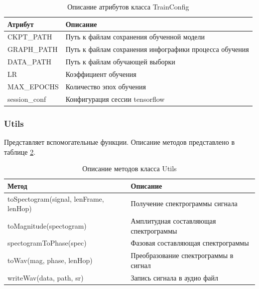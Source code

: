 \begin{table}[h]
	\caption{\label{imp:trainconfig}Описание атрибутов класса TrainConfig}
	\begin{center}
		\begin{tabular}{|p{}|p{}|}
			\hline
			Атрибут & Описание \\
			\hline
			CKPT\_PATH & Путь к файлам сохранения обученной модели \\	
			\hline
			GRAPH\_PATH & Путь к файлам сохранения инфографики процесса обучения \\	
			\hline
			DATA\_PATH & Путь к файлам обучающей выборки \\
			\hline
			LR & Коэффициент обучения \\
			\hline
			MAX\_EPOCHS & Количество эпох обучения \\
			\hline
			session\_conf & Конфигурация сессии tensorflow \\
			\hline
		\end{tabular}
	\end{center}
\end{table}

\subsubsection*{Utils}

Представляет вспомогательные функции. Описание методов представлено в таблице \ref{imp:utils}.

\begin{table}[h]
	\caption{\label{imp:utils}Описание методов класса Utils}
	\begin{center}
		\begin{tabular}{|p{}|p{}|}
			\hline
			Метод & Описание \\
			\hline
			toSpectogram(signal, lenFrame, lenHop) & Получение спектрограммы сигнала \\	
			\hline
			toMagnitude(spectogram) & Амплитудная составляющая спектрограммы \\
			\hline
			spectogramToPhase(spec) & Фазовая составляющая спектрограммы \\
			\hline
			toWav(mag, phase, lenHop) & Преобразование спектрограммы в сигнал \\
			\hline
			writeWav(data, path, sr) & Запись сигнала в аудио файл \\
			\hline
		\end{tabular}
	\end{center}
\end{table} 

